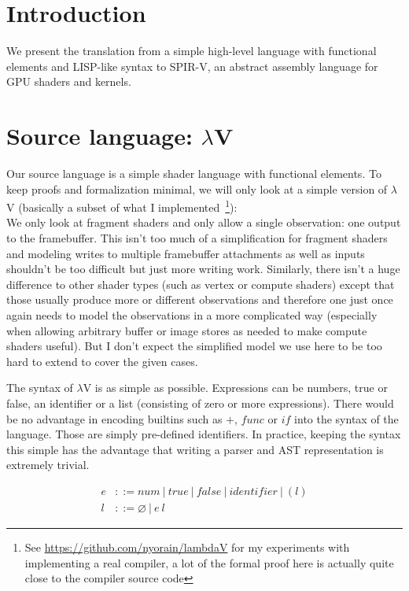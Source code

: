 \documentclass[letterpaper,12pt]{article}
\begin{document}
\section{Introduction}

We present the translation from a simple high-level language with
functional elements and LISP-like syntax to SPIR-V, an abstract
assembly language for GPU shaders and kernels.

\section{Source language: $\lambda$V}

Our source language is a simple shader language with functional elements.
To keep proofs and formalization minimal, we will only look at a simple
version of $\lambda$V (basically a subset of what I implemented~\footnote{See 
\url{https://github.com/nyorain/lambdaV} for my experiments with implementing
a real compiler, a lot of the formal proof here is actually quite close
to the compiler source code}): \\
We only look at fragment shaders and only allow a single observation:
one output to the framebuffer. This isn't too much of a simplification
for fragment shaders and modeling writes to multiple framebuffer attachments
as well as inputs shouldn't be too difficult but just more writing work.
Similarly, there isn't a huge difference to other shader types (such as 
vertex or compute shaders) except that those usually produce more or
different observations and therefore one just once again needs to model the
observations in a more complicated way (especially when allowing
arbitrary buffer or image stores as needed to make compute shaders
useful). But I don't expect the simplified model we use here to be too hard
to extend to cover the given cases.

The syntax of $\lambda$V is as simple as possible. Expressions
can be numbers, true or false, an identifier or a list (consisting of zero or
more expressions). There would be no advantage in encoding builtins such
as $+$, $func$ or $if$ into the syntax of the language. Those are simply
pre-defined identifiers. In practice, keeping the syntax this simple has 
the advantage that writing a parser and AST representation is extremely trivial.

\begin{align*}
	e &::= num \:|\: true \:|\: false \:|\: \textit{identifier} \:|\: (l) \\
	l &::= \varnothing \:|\: e\:l
\end{align*}
\end{document}
